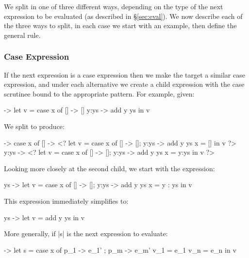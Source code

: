 \documentclass[draft]{sigplanconf}
\begin{document}
\smallskip
We split in one of three different ways, depending on the type of the next expression to be evaluated (as described in \S\ref{sec:eval}). We now describe each of the three ways to split, in each case we start with an example, then define the general rule.

\subsubsection{Case Expression}
\label{sec:eval_split_case}

If the next expression is a case expression then we make the target a similar case expression, and under each alternative we create a child expression with the case scrutinee bound to the appropriate pattern. For example, given:

\begin{code}
\x ->  let   v = case  x of
                       []    -> []
                       y:ys  -> add y ys
       in    v
\end{code}

\noindent We split to produce:

\begin{code}
\x ->  case x of
       []    -> <?  let  v =  case x of [] -> []; y:ys -> add y ys
                         x =  []
                    in   v ?>
       y:ys  -> <?  let  v =  case x of [] -> []; y:ys -> add y ys
                         x =  y:ys
                    in   v ?>
\end{code}

Looking more closely at the second child, we start with the expression:

\begin{code}
\y ys ->  let  v  = case x of [] -> []; y:ys -> add y ys
               x  = y : ys
          in   v
\end{code}

\noindent This expression immediately simplifies to:

\begin{code}
\y ys ->  let  v = add y ys
          in   v
\end{code}

More generally, if |s| is the next expression to evaluate:

\begin{code}
\free ->  let  s    = case x of p_1 -> e_1' ; p_m -> e_m'
               v_1  = e_1
               v_n  = e_n
          in   v
\end{code}
\end{document}
